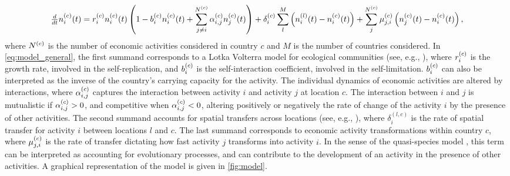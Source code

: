\begin{equation}\label{eq:model_general}
    \tfrac{d}{dt} n_i^{(c)}(t)  = r_i^{(c)}  n_i^{(c)}(t) \left(1 -   b_i^{(c)}  n_i^{(c)}(t)  + \sum_{j \neq i}^{N^{(c)}} \alpha^{(c)} _{i,j} n_j^{(c)}(t) \right) + \delta^{(c)}_{i} \sum_l^M \left( n_i^{(l)}(t) - n_i^{(c)}(t)  \right) + \sum_j^{N^{(c)}} \mu^{(c)} _{j,i}\left( n_j^{(c)}(t)  - n_i^{(c)}(t)  \right),
\end{equation}
where $N^{(c)}$ is the number of economic activities considered in country $c$ and $M$ is the number of countries considered.
% 
In \cref{eq:model_general}, the first summand corresponds to a Lotka Volterra model for ecological communities (see, e.g., \cite{Bunin2017,Scheffer2006a,Case1990}), where  $r_i^{(c)} $ is the growth rate, involved in the self-replication, and $b_i^{(c)} $ is the self-interaction coefficient, involved in the self-limitation. $b_i^{(c)} $ can also be interpreted as the inverse of the country's carrying capacity for the activity. %
%
The individual dynamics of economic activities are altered by interactions, where $\alpha_{i,j}^{(c)} $ captures the interaction between activity $ i $ and activity $ j $ at location $c$. The interaction between $i$ and $j$ is mutualistic if $\alpha_{i,j}^{(c)}  > 0$, and competitive when $\alpha_{i,j}^{(c)}  < 0$, altering positively or negatively the rate of change of the activity $i$ by the presence of other activities.
%
The second summand accounts for spatial transfers across locations (see, e.g., \cite{Tilman1994b}), where $\delta^{(l,c)}_{i}$ is the rate of spatial transfer for activity $i$ between locations $l$ and $c$.
% 
The last summand corresponds to economic activity transformations within country $c$, where $\mu^{(c)} _{j,i}$ is the rate of transfer dictating how fast activity $j$ transforms into activity $i$. In the sense of the quasi-species model \cite{eigen1988molecular}, this term can be interpreted as accounting for evolutionary processes, and can contribute to the development of an activity in the presence of other activities.
%
A graphical representation of the model is given in \cref{fig:model}.

